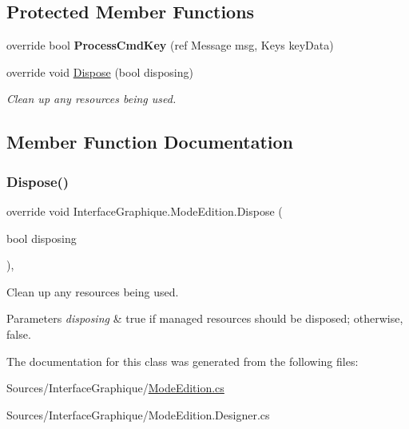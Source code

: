 \subsection*{Protected Member Functions}
\begin{DoxyCompactItemize}
\item 
override bool {\bfseries Process\+Cmd\+Key} (ref Message msg, Keys key\+Data)
\item 
override void \hyperlink{class_interface_graphique_1_1_mode_edition_abcb92e7500b3c90cdc6fcc24ae0c3234}{Dispose} (bool disposing)
\begin{DoxyCompactList}\small\item\em Clean up any resources being used. \end{DoxyCompactList}\end{DoxyCompactItemize}


\subsection{Member Function Documentation}
\hypertarget{class_interface_graphique_1_1_mode_edition_abcb92e7500b3c90cdc6fcc24ae0c3234}{}\label{class_interface_graphique_1_1_mode_edition_abcb92e7500b3c90cdc6fcc24ae0c3234} 
\subsubsection{\texorpdfstring{Dispose()}{Dispose()}}
{\footnotesize\ttfamily override void Interface\+Graphique.\+Mode\+Edition.\+Dispose (\begin{DoxyParamCaption}\item[{bool}]{disposing }\end{DoxyParamCaption})\hspace{0.3cm}{\ttfamily [inline]}, {\ttfamily [protected]}}



Clean up any resources being used. 


\begin{DoxyParams}{Parameters}
{\em disposing} & true if managed resources should be disposed; otherwise, false.\\
\hline
\end{DoxyParams}


The documentation for this class was generated from the following files\+:\begin{DoxyCompactItemize}
\item 
Sources/\+Interface\+Graphique/\hyperlink{_mode_edition_8cs}{Mode\+Edition.\+cs}\item 
Sources/\+Interface\+Graphique/Mode\+Edition.\+Designer.\+cs\end{DoxyCompactItemize}
